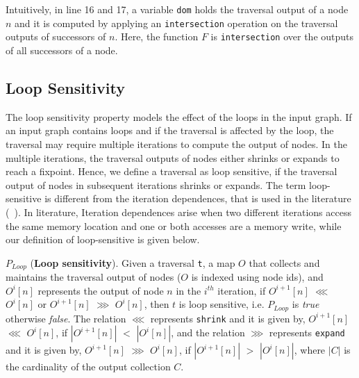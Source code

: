 Intuitively, in line 16 and 17, a variable \lstinline|dom| holds
the traversal output of a node $n$ and it is computed by applying an
\lstinline|intersection| operation on the traversal outputs of successors of
$n$. Here, the function $F$ is \lstinline|intersection| over the outputs of all
successors of a node.

\subsection{Loop Sensitivity}
The loop sensitivity property models the effect of the loops in the input graph.
If an input graph contains loops and if the traversal is affected by the loop,
the traversal may require multiple iterations to compute the output of nodes.
In the multiple iterations, the traversal outputs of nodes either shrinks or
expands to reach a fixpoint. Hence, we define a traversal as loop sensitive,
if the traversal output of nodes in subsequent iterations shrinks or expands. The term loop-sensitive is different from the iteration dependences, that is used in the literature (~\cite{blume1996parallel}). In literature, Iteration dependences arise when two different iterations access the same memory location and one or both
accesses are a memory write, while our definition of loop-sensitive is given below.

\begin{definition}\label{def:loop-sensitivity}
$P_{Loop}$ (\textbf{Loop sensitivity}). Given a traversal \lstinline|t|, a map
$O$ that collects and maintains the traversal output of nodes ($O$ is indexed
using node ids), and $O^i[n]$ represents the output of node $n$ in the $i^{th}$
iteration, if $O^{i+1}[n]$ $\lll$ $O^{i}[n]$ or $O^{i+1}[n]$ $\ggg$ $O^{i}[n]$,
then $t$ is loop sensitive, i.e. $P_{Loop}$ is \textit{true} otherwise
\textit{false}.
The relation $\lll$ represents \lstinline|shrink| and it is given by,
$O^{i+1}[n]$ $\lll$ $O^{i}[n]$, if $|O^{i+1}[n]|$ $<$ $|O^{i}[n]|$, and the
relation $\ggg$ represents \lstinline|expand| and it is given by, $O^{i+1}[n]$
$\ggg$ $O^{i}[n]$, if $|O^{i+1}[n]|$ $>$ $|O^{i}[n]|$, where $|C|$ is the
cardinality of the output collection $C$.
\end{definition}

